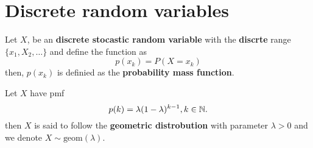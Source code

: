 \chapter{Discrete random variables}
\begin{definition}
  Let $X$, be an \textbf{discrete stocastic random variable} with the \textbf{discrte} range $\{x_{1}, X_{2}, \ldots\}$ and define the function as
  \begin{equation*}
    p(x_{k}) = P(X = x_{k})
  \end{equation*}
  then, $p(x_{k})$ is definied as the \textbf{probability mass function}.
\end{definition}

\begin{definition}
  Let $X$ have pmf
  \begin{equation*}
    p(k) = \lambda (1 - \lambda)^{k - 1}, k \in \mathbb{N}.
  \end{equation*}
  then $X$ is said to follow the \textbf{geometric distrobution} with parameter $\lambda > 0$ and we denote $X \sim \text{geom}(\lambda)$.
\end{definition}

